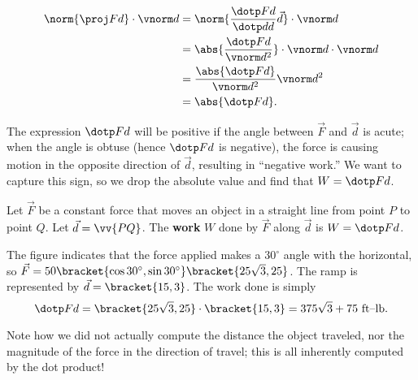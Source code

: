 
\begin{align*}
\norm{\proj Fd}\cdot\vnorm d
 &= \norm{\frac{\dotp Fd}{\dotp dd}\vec d}\cdot \vnorm d \\
		&= \abs{\frac{\dotp Fd}{\vnorm d^2}}\cdot \vnorm d\cdot\vnorm d\\
		&= \frac{\abs{\dotp Fd}}{\vnorm d^2}\vnorm d^2\\
		&= \abs{\dotp Fd}.
\end{align*}

The expression $\dotp Fd$ will be positive if the angle between $\vec F$ and $\vec d$ is acute; when the angle is obtuse (hence $\dotp Fd$ is negative), the force is causing motion in the opposite direction of $\vec d$, resulting in ``negative work.'' We want to capture this sign, so we drop the absolute value and find that $W = \dotp Fd$.

{Let $\vec F$ be a constant force that moves an object in a straight line from point $P$ to point $Q$. Let $\vec d = \vv{PQ}$. The \textbf{work} $W$ done by $\vec F$ along $\vec d$ is $W = \dotp Fd$.}


{The figure indicates that the force applied makes a $30^\circ$ angle with the horizontal, so $\vec F = 50\bracket{\cos 30^\circ,\sin 30^\circ}\bracket{25\sqrt3,25}%
$. The ramp is represented by $\vec d  =\bracket{15,3}$. The work done is simply
\[\dotp Fd = \bracket{25\sqrt3,25}\cdot\bracket{15,3}=375\sqrt3+75%
\text{ ft--lb}.\]

Note how we did not actually compute the distance the object traveled, nor the magnitude of the force in the direction of travel; this is all inherently computed by the dot product!}

